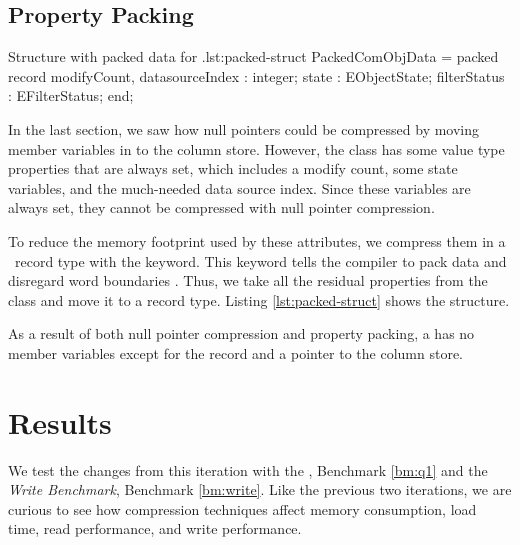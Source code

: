 \subsection{Property Packing}
\label{compression:property-packing}
\begin{delphicode}{Structure with packed data for .}{lst:packed-struct}
PackedComObjData = packed record
    modifyCount,
    datasourceIndex    : integer; 
    state              : EObjectState;
    filterStatus       : EFilterStatus;
end;
\end{delphicode}
In the last section, we saw how null pointers could be compressed by moving member variables in  to the column store. However, the  class has some value type properties that are always set, which includes a modify count, some state variables, and the much-needed data source index. Since these variables are always set, they cannot be compressed with null pointer compression.

To reduce the memory footprint used by these attributes, we compress them in a \delphi~record type with the  keyword. This keyword tells the compiler to pack data and disregard word boundaries \cite{noauthor_undated-vu}. Thus, we take all the residual properties from the  class and move it to a  record type. Listing \ref{lst:packed-struct} shows the structure.

As a result of both null pointer compression and property packing, a  has no member variables except for the  record and a pointer to the column store.

\section{Results}
\label{sec:Results}
We test the changes from this iteration with the \tpchdl, Benchmark \ref{bm:q1} and the \textit{Write Benchmark}, Benchmark \ref{bm:write}. Like the previous two iterations, we are curious to see how compression techniques affect memory consumption, load time, read performance, and write performance. 

